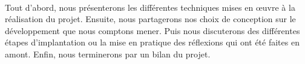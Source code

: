 \paragraph{}
Tout d'abord, nous présenterons les différentes techniques mises en \oe{}uvre à la réalisation du projet. Ensuite, nous partagerons nos choix de conception sur le développement que nous comptons mener. Puis nous discuterons des différentes étapes d'implantation ou la mise en pratique des réflexions qui ont été faites en amont. Enfin, nous terminerons par un bilan du projet. 